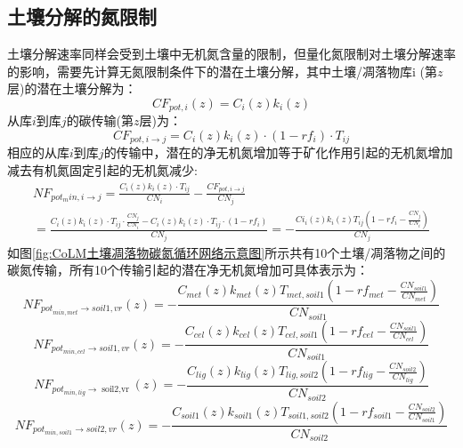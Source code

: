 \subsection{土壤分解的氮限制}\label{土壤分解的氮限制}
土壤分解速率同样会受到土壤中无机氮含量的限制，但量化氮限制对土壤分解速率的影响，需要先计算无氮限制条件下的潜在土壤分解，其中土壤/凋落物库i (第$z$层)的潜在土壤分解为：
\begin{equation}
C F_{pot, i}(z)=C_{i}(z) k_{i}(z)
\end{equation}
从库$i$到库$j$的碳传输(第$z$层)为：
\begin{equation}
C F_{pot, i \rightarrow j}=C_{i}(z) k_{i}(z) \cdot\left(1-r f_{i}\right) \cdot T_{i j}
\end{equation}
相应的从库$i$到库$j$的传输中，潜在的净无机氮增加等于矿化作用引起的无机氮增加减去有机氮固定引起的无机氮减少:
\begin{equation}
\begin{array}{l}N F_{pot_{m} i n, i \rightarrow j}=\frac{C_{i}(z) k_{i}(z) \cdot T_{i j}}{C N_{i}}-\frac{C F_{pot, i \rightarrow j}}{C N_{j}} \\
     =\frac{C_{i}(z) k_{i}(z) \cdot T_{i j} \cdot \frac{C N_{j}}{C N_{i}}-C_{i}(z) k_{i}(z) \cdot T_{i j} \cdot\left(1-r f_{i}\right)}{C N_{j}}=
     -\frac{C i_{i}(z) k_{i}(z) T_{i j}\left(1-r f_{i}-\frac{C N_{j}}{C N_{i}}\right)}{C N_{j}}\end{array}
\end{equation}
如图\ref{fig:CoLM土壤凋落物碳氮循环网络示意图}所示共有10个土壤/凋落物之间的碳氮传输，所有10个传输引起的潜在净无机氮增加可具体表示为：
\begin{equation}\label{NF_pot_minmet}
    N F_{{pot}_{min,met} \rightarrow {soil1,vr}}(z)=-\frac{C_{{met}}(z) k_{{met}}(z) T_{met, soil1}\left(1-r f_{met}-\frac{C N_{{soil1 }}}{C N_{met}}\right)}{C N_{{soil1 }}}
\end{equation}
\begin{equation}
N F_{pot_{min,cel} \rightarrow { soil1,vr }}(z)=-\frac{C_{cel}(z) k_{cel}(z) T_{cel, soil1}\left(1-r f_{cel}-\frac{C N_{{soil 1}}}{C N_{cel}}\right)}{C N_{{soil1}}}
\end{equation}
\begin{equation}
N F_{pot_{min,lig} \rightarrow \operatorname{soil2,vr}}(z)=-\frac{C_{lig}(z) k_{lig}(z) T_{lig, soil2}\left(1-r f_{lig}-\frac{C N_{{soil2 }}}{C N_{lig}}\right)}{C N_{{soil2 }}}
\end{equation}
\begin{equation}
NF_{pot_{min,soil1}\rightarrow soil2,vr}\left(z\right)=-\frac{C_{soil1}\left(z\right)k_{soil1}\left(z\right)T_{soil1,soil2}\left(1-rf_{soil1}-\frac{CN_{soil2}}{CN_{soil1}}\right)}{CN_{soil2}}
\end{equation}
